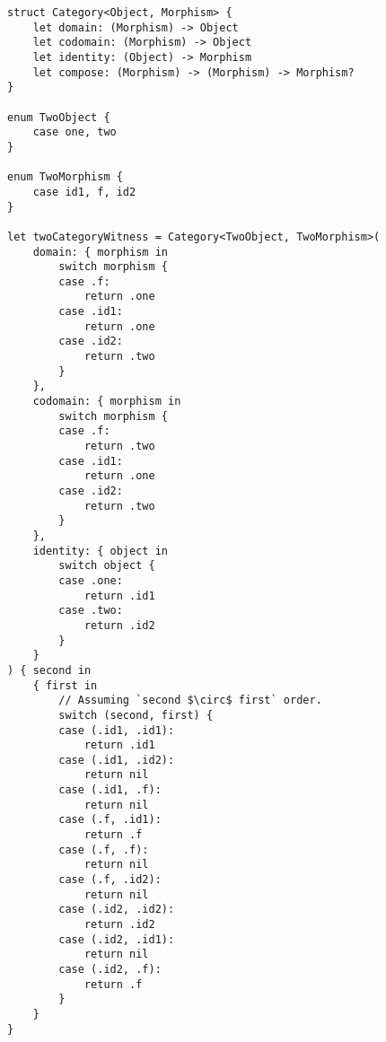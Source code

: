 \documentclass{article}
\begin{document}
\begin{verbatim}
struct Category<Object, Morphism> {
	let domain: (Morphism) -> Object
	let codomain: (Morphism) -> Object
	let identity: (Object) -> Morphism
	let compose: (Morphism) -> (Morphism) -> Morphism?
}

enum TwoObject {
	case one, two
}

enum TwoMorphism {
	case id1, f, id2
}

let twoCategoryWitness = Category<TwoObject, TwoMorphism>(
	domain: { morphism in
		switch morphism {
		case .f:
			return .one
		case .id1:
			return .one
		case .id2:
			return .two
		}
	},
	codomain: { morphism in
		switch morphism {
		case .f:
			return .two
		case .id1:
			return .one
		case .id2:
			return .two
		}
	},
	identity: { object in
		switch object {
		case .one:
			return .id1
		case .two:
			return .id2
		}
	}
) { second in
	{ first in
		// Assuming `second $\circ$ first` order.
		switch (second, first) {
		case (.id1, .id1):
			return .id1
		case (.id1, .id2):
			return nil
		case (.id1, .f):
			return nil
		case (.f, .id1):
			return .f
		case (.f, .f):
			return nil
		case (.f, .id2):
			return nil
		case (.id2, .id2):
			return .id2
		case (.id2, .id1):
			return nil
		case (.id2, .f):
			return .f
		}
	}
}

\end{verbatim}
\end{document}
